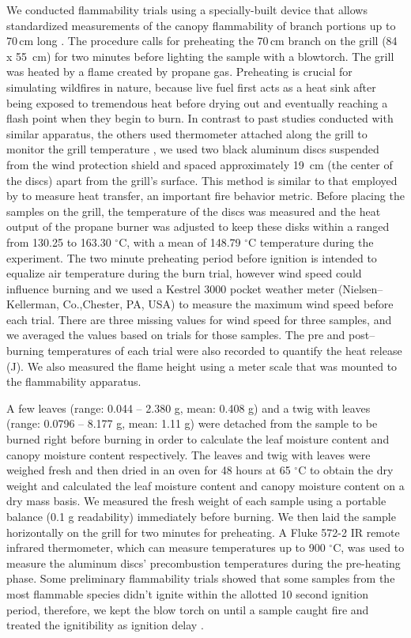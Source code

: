 \documentclass{bmcart}
\begin{document}
We conducted flammability trials using a specially-built device that allows standardized measurements of the canopy flammability of branch portions up to 70\,cm long \citep{jaureguiberry2011device}. The procedure calls for preheating the 70\,cm branch on the grill (84 x 55 \,cm) for two minutes before lighting the sample with a blowtorch. The grill was heated by a flame created by propane gas. Preheating is crucial for simulating wildfires in nature, because live fuel first acts as a heat sink after being exposed to tremendous heat before drying out and eventually reaching a flash point when they begin to burn. In contrast to past studies conducted with similar apparatus, the others used thermometer attached along the grill to monitor the grill temperature \citep{jaureguiberry2011device}, we used two black aluminum discs  suspended from the wind protection shield and spaced approximately 19 \,cm (the center of the discs) apart from the grill's surface. This method is similar to that employed by \citet{gao2022burn} to measure heat transfer, an important fire behavior metric. Before placing the samples on the grill, the temperature of the discs was measured and the heat output of the propane burner was adjusted to keep these disks within a ranged from 130.25 to 163.30 $^{\circ}$C, with a mean of 148.79 $^{\circ}$C temperature  during the experiment. The two minute preheating period before ignition is intended to equalize air temperature during the burn trial, however wind speed could influence burning and we used
a Kestrel 3000 pocket weather meter (Nielsen–Kellerman, Co.,Chester, PA, USA) to
measure the maximum wind speed before each trial. There are three missing values for wind speed for three samples, and we averaged the values based on trials for those samples. 
The pre and post--burning temperatures of each trial were also recorded to quantify the heat release (J). We also measured the flame height using a meter scale that was mounted to the flammability apparatus.


A few leaves (range: 0.044 -- 2.380 g, mean: 0.408 g) and a twig with leaves (range: 0.0796 -- 8.177 g, mean: 1.11 g) were detached from the sample to be burned right before burning in order to calculate the leaf moisture content and canopy moisture content respectively. The leaves and twig with leaves were weighed fresh and then dried in an oven for 48 hours at 65 $^{\circ}$C to obtain the dry weight and calculated the leaf moisture content and canopy moisture content on a dry mass basis. We measured the fresh weight of each sample using a portable balance (0.1 g readability) immediately before burning. We then laid the sample horizontally on the grill for two minutes for preheating. A Fluke 572-2 IR remote infrared thermometer, which can measure temperatures up to 900 $^{\circ}$C, was used to measure the aluminum discs' precombustion temperatures during the pre-heating phase. Some preliminary flammability trials showed that some samples from the most flammable species didn't ignite within the allotted 10 second ignition period, therefore, we kept the blow torch on until a sample caught fire and treated the ignitibility as ignition delay \citep{anderson1970forest}.  
 
\end{document}
